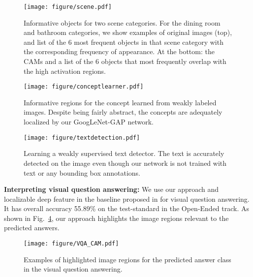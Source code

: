 \documentclass[10pt,twocolumn,letterpaper]{article}
\begin{document}
\begin{figure}
\begin{center}
\texttt{[image: figure/scene.pdf]}
\end{center}
\vspace*{-4mm}
\caption{Informative objects for two scene categories. For the dining room and bathroom categories, we show examples of original images (top), and list of the $6$ most frequent objects in that scene category with the corresponding frequency of appearance. At the bottom: the CAMs and a list of the 6 objects that most frequently overlap with the high activation regions.}
\label{fig:scene}
\end{figure}

\begin{figure}
\begin{center}
\texttt{[image: figure/conceptlearner.pdf]}
\end{center}
\vspace*{-4mm}
\caption{Informative regions for the concept learned from weakly labeled images. Despite being fairly abstract, the concepts are adequately localized by our GoogLeNet-GAP network.}
\label{fig:conceptlearner}
\end{figure}

\begin{figure}
\begin{center}
\texttt{[image: figure/textdetection.pdf]}
\end{center}
\vspace*{-4mm}
\caption{Learning a weakly supervised text detector. The text is accurately detected on the image even though our network is not trained with  text or any bounding box annotations.}
\label{fig:textdetection}
\end{figure}

 
 \textbf{Interpreting visual question answering:} We use our approach and localizable deep feature in the baseline proposed in \cite{zhou2015vqa} for visual question answering. It has overall accuracy 55.89\% on the test-standard in the Open-Ended track. As shown in Fig.~\ref{fig:vqa}, our approach highlights the image regions relevant to the predicted answers.

\begin{figure}
\begin{center}
\texttt{[image: figure/VQA\_CAM.pdf]}
\end{center}
\caption{Examples of highlighted image regions for the predicted answer class in the visual question answering.}
\label{fig:vqa}
\end{figure}
\end{document}
